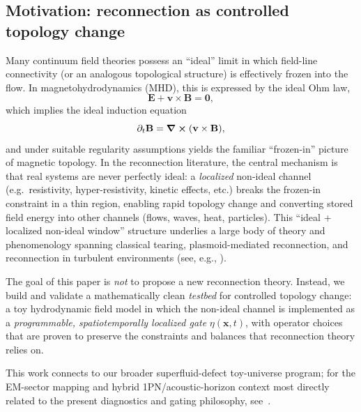\documentclass[11pt]{article}
\theoremstyle{plain}
\theoremstyle{definition}
\theoremstyle{remark}
\newcommand{\B}{\mathbf{B}}
\newcommand{\E}{\mathbf{E}}
\newcommand{\vfield}{\mathbf{v}}
\begin{document}
\subsection{Motivation: reconnection as controlled topology change}\label{sec:intro_motivation}
Many continuum field theories possess an ``ideal'' limit in which field-line connectivity (or an analogous topological structure) is effectively frozen into the flow. In magnetohydrodynamics (MHD), this is expressed by the ideal Ohm law,
\begin{equation}
  \E + \vfield \times \B = \mathbf{0},
\end{equation}
which implies the ideal induction equation
\begin{equation}
  \partial_t \B = \curl(\vfield \times \B),
\end{equation}
and under suitable regularity assumptions yields the familiar ``frozen-in'' picture of magnetic topology. In the reconnection literature, the central mechanism is that real systems are never perfectly ideal: a \emph{localized} non-ideal channel (e.g.\ resistivity, hyper-resistivity, kinetic effects, etc.) breaks the frozen-in constraint in a thin region, enabling rapid topology change and converting stored field energy into other channels (flows, waves, heat, particles). This ``ideal + localized non-ideal window'' structure underlies a large body of theory and phenomenology spanning classical tearing, plasmoid-mediated reconnection, and reconnection in turbulent environments (see, e.g., \cite{Loureiro2007,Bhattacharjee2009,Comisso2016}).

The goal of this paper is \emph{not} to propose a new reconnection theory. Instead, we build and validate a mathematically clean \emph{testbed} for controlled topology change: a toy hydrodynamic field model in which the non-ideal channel is implemented as a \emph{programmable, spatiotemporally localized gate} $\eta(\mathbf{x},t)$, with operator choices that are proven to preserve the constraints and balances that reconnection theory relies on.

This work connects to our broader superfluid-defect toy-universe program; for the EM-sector mapping and hybrid 1PN/acoustic-horizon context most directly related to the present diagnostics and gating philosophy, see~\cite{Norris:Paper4,Norris:Paper6}.
\end{document}
